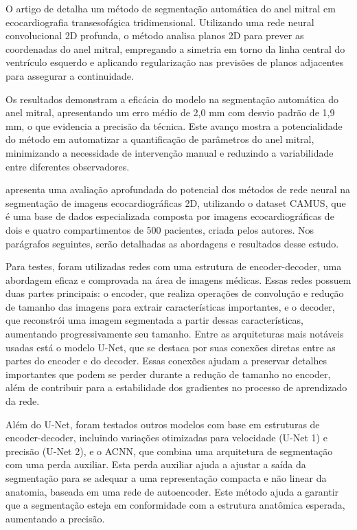 
O artigo de \textcite{8931542} detalha um método de segmentação automática do anel mitral em ecocardiografia transesofágica tridimensional. Utilizando uma rede neural convolucional 2D profunda, o método analisa planos 2D para prever as coordenadas do anel mitral, empregando a simetria em torno da linha central do ventrículo esquerdo e aplicando regularização nas previsões de planos adjacentes para assegurar a continuidade.

Os resultados demonstram a eficácia do modelo na segmentação automática do anel mitral, apresentando um erro médio de 2,0 mm com desvio padrão de 1,9 mm, o que evidencia a precisão da técnica. Este avanço mostra a potencialidade do método em automatizar a quantificação de parâmetros do anel mitral, minimizando a necessidade de intervenção manual e reduzindo a variabilidade entre diferentes observadores.


\textcite{8649738} apresenta uma avaliação aprofundada do potencial dos métodos de rede neural na segmentação de imagens ecocardiográficas 2D, utilizando o dataset CAMUS, que é uma base de dados especializada composta por imagens ecocardiográficas de dois e quatro compartimentos de 500 pacientes, criada pelos autores. Nos parágrafos seguintes, serão detalhadas as abordagens e resultados desse estudo.

Para testes, foram utilizadas redes com uma estrutura de encoder-decoder, uma abordagem eficaz e comprovada na área de imagens médicas. Essas redes possuem duas partes principais: o encoder, que realiza operações de convolução e redução de tamanho das imagens para extrair características importantes, e o decoder, que reconstrói uma imagem segmentada a partir dessas características, aumentando progressivamente seu tamanho. Entre as arquiteturas mais notáveis usadas está o modelo U-Net, que se destaca por suas conexões diretas entre as partes do encoder e do decoder. Essas conexões ajudam a preservar detalhes importantes que podem se perder durante a redução de tamanho no encoder, além de contribuir para a estabilidade dos gradientes no processo de aprendizado da rede.

Além do U-Net, foram testados outros modelos com base em estruturas de encoder-decoder, incluindo variações otimizadas para velocidade (U-Net 1) e precisão (U-Net 2), e o ACNN, que combina uma arquitetura de segmentação com uma perda auxiliar. Esta perda auxiliar ajuda a ajustar a saída da segmentação para se adequar a uma representação compacta e não linear da anatomia, baseada em uma rede de autoencoder. Este método ajuda a garantir que a segmentação esteja em conformidade com a estrutura anatômica esperada, aumentando a precisão.

